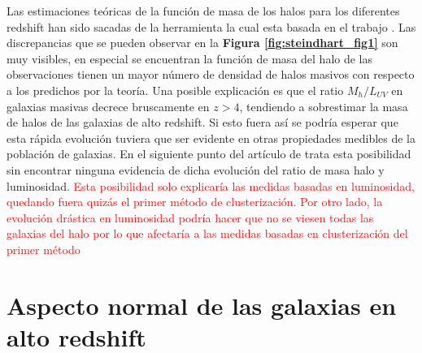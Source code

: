 \documentclass{article}
\begin{document}
Las estimaciones teóricas de la función de masa de los halos para los diferentes redshift han sido sacadas de la herramienta \cite{murray2013hmfcalc} la cual esta basada en el trabajo \cite{sheth2001ellipsoidal}. Las discrepancias que se pueden observar en la \textbf{Figura \ref{fig:steindhart_fig1}} son muy visibles, en especial se encuentran la función de masa del halo de las observaciones tienen un mayor número de densidad de halos masivos con respecto a los predichos por la teoría. Una posible explicación es que el ratio $M_h/L_{UV}$ en galaxias masivas decrece bruscamente en $z>4$, tendiendo a sobrestimar la masa de halos de las galaxias de alto redshift. Si esto fuera así se podría esperar que esta rápida evolución tuviera que ser evidente en otras propiedades medibles de la población de galaxias. En el siguiente punto del artículo de \cite{steinhardt2016impossibly} trata esta posibilidad sin encontrar ninguna evidencia de dicha evolución del ratio de masa halo y luminosidad. \textcolor{red}{Esta posibilidad solo explicaría las medidas basadas en luminosidad, quedando fuera quizás el primer método de clusterización. Por otro lado, la evolución drástica en luminosidad podría hacer que no se viesen todas las galaxias del halo \citep{wang2019dominant} por lo que afectaría a las medidas basadas en clusterización del primer método}

\section*{Aspecto normal de las galaxias en alto redshift}

\newpage



\newpage
\appendix

\end{document}
